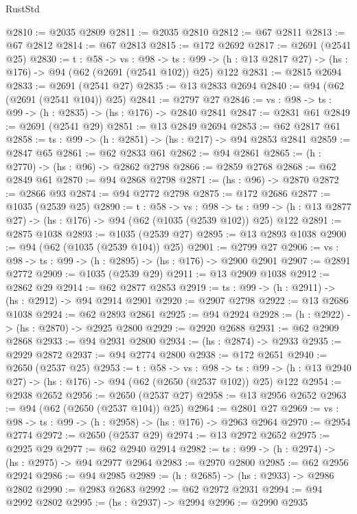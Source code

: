 \begin{lexlean}{RustStd}
\begin{coremodule}
@2810 := @2035 @2809
@2811 := @2035 @2810
@2812 := @67 @2811
@2813 := @67 @2812
@2814 := @67 @2813
@2815 := @172 @2692
@2817 := @2691 (@2541 @25)
@2830 := {t : @58} ->
  {vs : @98} ->
  {ts : @99} -> (h : @13 @2817 @27) -> (hs : @176) -> @94 (@62 (@2691 (@2541 @102)) @25) @122
@2831 := @2815 @2694
@2833 := @2691 (@2541 @27)
@2835 := @13 @2833 @2694
@2840 := @94 (@62 (@2691 (@2541 @104)) @25)
@2841 := @2797 @27
@2846 := {vs : @98} -> {ts : @99} -> (h : @2835) -> (hs : @176) -> @2840 @2841
@2847 := @2831 @61
@2849 := @2691 (@2541 @29)
@2851 := @13 @2849 @2694
@2853 := @62 @2817 @61
@2858 := {ts : @99} -> (h : @2851) -> (hs : @217) -> @94 @2853 @2841
@2859 := @2847 @65
@2861 := @62 @2833 @61
@2862 := @94 @2861
@2865 := (h : @2770) -> (hs : @96) -> @2862 @2798
@2866 := @2859 @2768
@2868 := @62 @2849 @61
@2870 := @94 @2868 @2798
@2871 := (hs : @96) -> @2870
@2872 := @2866 @93
@2874 := @94 @2772 @2798
@2875 := @172 @2686
@2877 := @1035 (@2539 @25)
@2890 := {t : @58} ->
  {vs : @98} ->
  {ts : @99} -> (h : @13 @2877 @27) -> (hs : @176) -> @94 (@62 (@1035 (@2539 @102)) @25) @122
@2891 := @2875 @1038
@2893 := @1035 (@2539 @27)
@2895 := @13 @2893 @1038
@2900 := @94 (@62 (@1035 (@2539 @104)) @25)
@2901 := @2799 @27
@2906 := {vs : @98} -> {ts : @99} -> (h : @2895) -> (hs : @176) -> @2900 @2901
@2907 := @2891 @2772
@2909 := @1035 (@2539 @29)
@2911 := @13 @2909 @1038
@2912 := @2862 @29
@2914 := @62 @2877 @2853
@2919 := {ts : @99} -> (h : @2911) -> (hs : @2912) -> @94 @2914 @2901
@2920 := @2907 @2798
@2922 := @13 @2686 @1038
@2924 := @62 @2893 @2861
@2925 := @94 @2924
@2928 := (h : @2922) -> (hs : @2870) -> @2925 @2800
@2929 := @2920 @2688
@2931 := @62 @2909 @2868
@2933 := @94 @2931 @2800
@2934 := (hs : @2874) -> @2933
@2935 := @2929 @2872
@2937 := @94 @2774 @2800
@2938 := @172 @2651
@2940 := @2650 (@2537 @25)
@2953 := {t : @58} ->
  {vs : @98} ->
  {ts : @99} -> (h : @13 @2940 @27) -> (hs : @176) -> @94 (@62 (@2650 (@2537 @102)) @25) @122
@2954 := @2938 @2652
@2956 := @2650 (@2537 @27)
@2958 := @13 @2956 @2652
@2963 := @94 (@62 (@2650 (@2537 @104)) @25)
@2964 := @2801 @27
@2969 := {vs : @98} -> {ts : @99} -> (h : @2958) -> (hs : @176) -> @2963 @2964
@2970 := @2954 @2774
@2972 := @2650 (@2537 @29)
@2974 := @13 @2972 @2652
@2975 := @2925 @29
@2977 := @62 @2940 @2914
@2982 := {ts : @99} -> (h : @2974) -> (hs : @2975) -> @94 @2977 @2964
@2983 := @2970 @2800
@2985 := @62 @2956 @2924
@2986 := @94 @2985
@2989 := (h : @2685) -> (hs : @2933) -> @2986 @2802
@2990 := @2983 @2683
@2992 := @62 @2972 @2931
@2994 := @94 @2992 @2802
@2995 := (hs : @2937) -> @2994
@2996 := @2990 @2935

\end{coremodule}
\end{lexlean}

